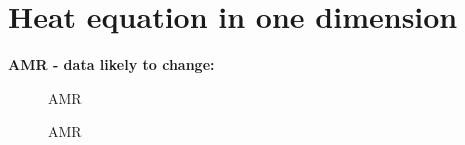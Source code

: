 \section{Heat equation in one dimension}

\begin{figure}[h]
    \centering
    
\end{figure}

\begin{figure}[h]
    \centering
    
\end{figure}

\begin{figure}[h]
    \centering
    
\end{figure}

\begin{figure}[h]
    \centering
    
\end{figure}

\begin{figure}[h]
    \centering
    
\end{figure}

\begin{figure}[h]
    \centering
    
\end{figure}

\textbf{AMR - data likely to change:}

\begin{figure}[h]
    \centering
    
    \caption{AMR}
\end{figure}

\begin{figure}[h]
    \centering
    
    \caption{AMR}
\end{figure}
